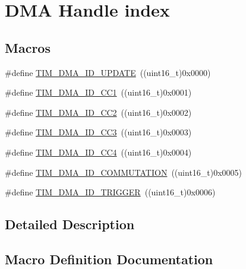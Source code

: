 \hypertarget{group___d_m_a___handle__index}{}\section{D\+MA Handle index}
\label{group___d_m_a___handle__index}
\subsection*{Macros}
\begin{DoxyCompactItemize}
\item 
\#define \mbox{\hyperlink{group___d_m_a___handle__index_ga15f38cee11f8b2b5a85cbf4552ba140d}{T\+I\+M\+\_\+\+D\+M\+A\+\_\+\+I\+D\+\_\+\+U\+P\+D\+A\+TE}}~((uint16\+\_\+t)0x0000)
\item 
\#define \mbox{\hyperlink{group___d_m_a___handle__index_ga7ca691eb5e29b0206d3390cc6e90079a}{T\+I\+M\+\_\+\+D\+M\+A\+\_\+\+I\+D\+\_\+\+C\+C1}}~((uint16\+\_\+t)0x0001)
\item 
\#define \mbox{\hyperlink{group___d_m_a___handle__index_ga9c52f32d4bd21dd2d232900219f0a111}{T\+I\+M\+\_\+\+D\+M\+A\+\_\+\+I\+D\+\_\+\+C\+C2}}~((uint16\+\_\+t)0x0002)
\item 
\#define \mbox{\hyperlink{group___d_m_a___handle__index_ga6e8145f305b54744bf2ef379a4315a40}{T\+I\+M\+\_\+\+D\+M\+A\+\_\+\+I\+D\+\_\+\+C\+C3}}~((uint16\+\_\+t)0x0003)
\item 
\#define \mbox{\hyperlink{group___d_m_a___handle__index_ga1860c00b370435ff40d9e65f14a61706}{T\+I\+M\+\_\+\+D\+M\+A\+\_\+\+I\+D\+\_\+\+C\+C4}}~((uint16\+\_\+t)0x0004)
\item 
\#define \mbox{\hyperlink{group___d_m_a___handle__index_gaa707c98bb11277665635ca7aef1e4193}{T\+I\+M\+\_\+\+D\+M\+A\+\_\+\+I\+D\+\_\+\+C\+O\+M\+M\+U\+T\+A\+T\+I\+ON}}~((uint16\+\_\+t)0x0005)
\item 
\#define \mbox{\hyperlink{group___d_m_a___handle__index_ga39900e5227e4d813a726a1df5d86671c}{T\+I\+M\+\_\+\+D\+M\+A\+\_\+\+I\+D\+\_\+\+T\+R\+I\+G\+G\+ER}}~((uint16\+\_\+t)0x0006)
\end{DoxyCompactItemize}


\subsection{Detailed Description}


\subsection{Macro Definition Documentation}
\mbox{\label{group___d_m_a___handle__index_ga7ca691eb5e29b0206d3390cc6e90079a}} 
